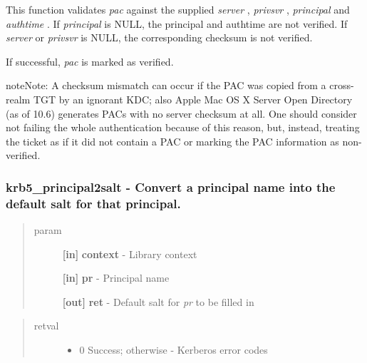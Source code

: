 \documentclass[letterpaper,10pt,english]{sphinxmanual}
\begin{document}
This function validates \emph{pac} against the supplied \emph{server} , \emph{privsvr} , \emph{principal} and \emph{authtime} . If \emph{principal} is NULL, the principal and authtime are not verified. If \emph{server} or \emph{privsvr} is NULL, the corresponding checksum is not verified.

If successful, \emph{pac} is marked as verified.

\begin{notice}{note}{Note:}
A checksum mismatch can occur if the PAC was copied from a cross-realm TGT by an ignorant KDC; also Apple Mac OS X Server Open Directory (as of 10.6) generates PACs with no server checksum at all. One should consider not failing the whole authentication because of this reason, but, instead, treating the ticket as if it did not contain a PAC or marking the PAC information as non-verified.
\end{notice}


\subsubsection{krb5\_principal2salt -  Convert a principal name into the default salt for that principal.}
\label{appdev/refs/api/krb5_principal2salt:krb5-principal2salt-convert-a-principal-name-into-the-default-salt-for-that-principal}\label{appdev/refs/api/krb5_principal2salt::doc}

\begin{fulllineitems}
\label{appdev/refs/api/krb5_principal2salt:krb5_principal2salt}
\end{fulllineitems}

\begin{quote}\begin{description}
\item[{param}] \leavevmode
\textbf{{[}in{]}} \textbf{context} - Library context

\textbf{{[}in{]}} \textbf{pr} - Principal name

\textbf{{[}out{]}} \textbf{ret} - Default salt for \emph{pr} to be filled in

\end{description}\end{quote}
\begin{quote}\begin{description}
\item[{retval}] \leavevmode\begin{itemize}
\item {} 
0   Success; otherwise - Kerberos error codes

\end{itemize}

\end{description}\end{quote}
\end{document}
